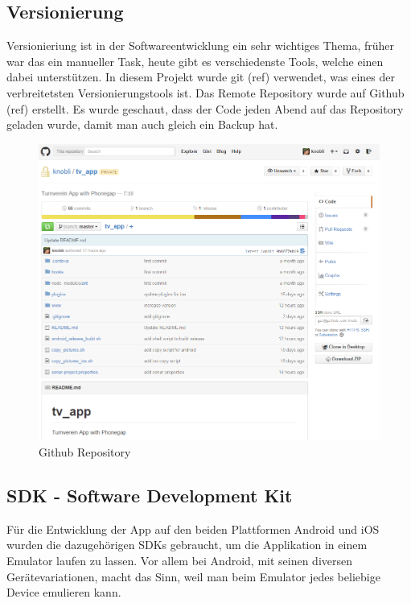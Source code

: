 \subsection{Versionierung}
Versionieriung ist in der Softwareentwicklung ein sehr wichtiges Thema, früher war das ein manueller Task, heute gibt es verschiedenste Tools, welche einen dabei unterstützen. In diesem Projekt wurde git (ref) verwendet, was eines der verbreitetsten Versionierungstools ist. Das Remote Repository wurde auf Github (ref) erstellt. Es wurde geschaut, dass der Code jeden Abend auf das Repository geladen wurde, damit man auch gleich ein Backup hat.

\begin{figure}[h]
\centering
\includegraphics[scale=0.5]{images/github.png}
\caption{Github Repository}
\label{fig:github_repo}
\end{figure}

\newpage
\subsection{SDK - Software Development Kit}
Für die Entwicklung der App auf den beiden Plattformen Android und iOS wurden die dazugehörigen SDKs gebraucht, um die Applikation in einem Emulator laufen zu lassen. Vor allem bei Android, mit seinen diversen Gerätevariationen, macht das Sinn, weil man beim Emulator jedes beliebige Device emulieren kann.

